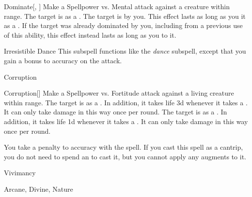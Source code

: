 \begin{ability}[\nth{5}]{Dominate}[, ]
Make a Spellpower vs. Mental attack against a creature within \rngmed range.
\hit The target is  as a .
\crit The target is  by you.
This effect lasts as long as you  it as a .
If the target was already dominated by you, including from a previous use of this ability, this effect instead lasts as long as you  to it.
\end{ability}
\vspace{0.25em}


\begin{ability}[\nth{9}]{Irresistible Dance}
This subspell functions like the \textit{dance} subspell, except that you gain a  bonus to accuracy on the attack.
\end{ability}
\vspace{0.25em}

\newpage
\begin{spellsection}{Corruption}

\begin{spellheader}
\end{spellheader}


\begin{ability}{Corruption}[]
Make a Spellpower vs. Fortitude attack against a living creature within \rngclose range.
\hit The target is  as a .
In addition, it takes life  \minus3d whenever it takes a .
It can only take damage in this way once per round.
\crit The target is  as a .
In addition, it takes life  \minus1d whenever it takes a .
It can only take damage in this way once per round.
\end{ability}



You take a  penalty to accuracy with the spell.
If you cast this spell as a cantrip,
you do not need to spend an  to cast it,
but you cannot apply any augments to it.


 Vivimancy

 Arcane, Divine, Nature
\end{spellsection}


